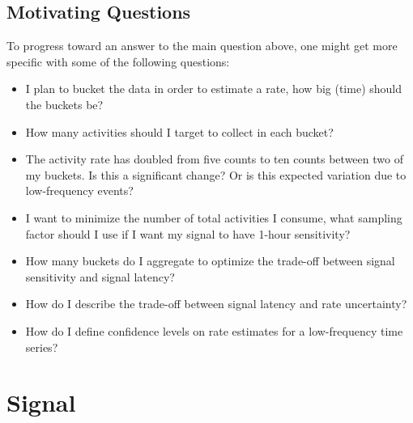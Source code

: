 \documentclass{article}
\begin{document}
\subsection{Motivating Questions} 

To progress toward an answer to the main question above, one might get more specific with some of the following questions:

\begin{itemize}
\item I plan to bucket the data in order to estimate a rate, how big (time) should the buckets be? 
\item How many activities should I target to collect in each bucket?
\item The activity rate has doubled from five counts to ten counts between two of my buckets. Is this a significant change? Or is this expected variation due to low-frequency events?
\item I want to minimize the number of total activities I consume, what sampling factor should I use if I want my signal to have 1-hour sensitivity?
\item How many buckets do I aggregate to optimize the trade-off between signal sensitivity and signal latency?
\item How do I describe the trade-off between signal latency and rate uncertainty?
\item How do I define confidence levels on rate estimates for a low-frequency time series?
\end{itemize}







\section{Signal} 



\end{document}
